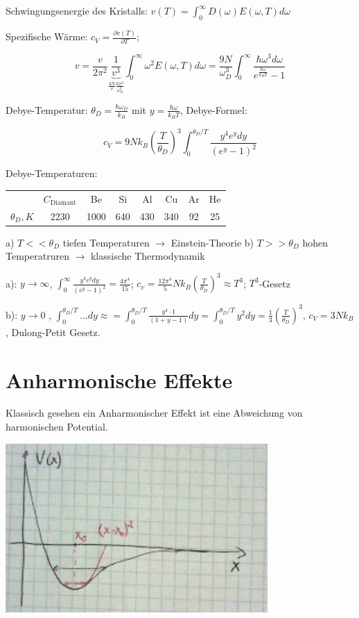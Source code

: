 Schwingungsenergie des Kristalls: \(v(T) = \int_0^\infty D(\omega) E(\omega,T) d\omega\)

Spezifische Wärme: \(c_V = \frac{\partial v(T)}{\partial T}\); 

\[v=\frac{v}{2\pi^2}\underbrace{\frac{1}{v^3}}_{\frac{3N}{v}\frac{6\pi^2}{\omega_D^3}}\int_0^\infty \omega^2 E(\omega,T) d\omega=\frac{9N}{\omega_D^3}\int_0^\infty\frac{\hbar \omega^3 d\omega}{e^{\frac{\hbar \omega}{k_B T}}-1}\]

Debye-Temperatur: \(\theta_D = \frac{\hbar \omega_D}{k_B}\) mit \(y= \frac{\hbar \omega}{k_BT}\), Debye-Formel:

\[ c_V = 9Nk_B\left(\frac{T}{\theta_D}\right)^3 \int_0^{\theta_D/T}\frac{y^4e^ydy}{(e^y-1)^2}\]


Debye-Temperaturen:

\begin{tabular}{c|ccccccc}
 &\(C_{\text{Diamant}}\)&Be&Si&Al&Cu&Ar&He\\
\(\theta_D,K\)&2230&1000&640&430&340&92&25
\end{tabular}

a) \(T<<\theta_D\) tiefen Temperaturen \(\rightarrow\) Einstein-Theorie
b) \(T>>\theta_D\) hohen Temperatruren  \(\rightarrow\) klassische Thermodynamik

a): \(y\rightarrow \infty\), \(\int_0^\infty \frac{y^4e^ydy}{(e^y-1)^2} = \frac{4\pi^4}{15}\); \(c_v = \frac{12\pi^4}{5}Nk_B\left(\frac{T}{\theta_D}\right)^3 \approx T^3\); \(T^3\)-Gesetz

b): \(y\rightarrow 0\) , \(\int_0^{\theta_D/T}...dy \approx = \int_0^{\theta_D/T}\frac{y^4\cdot 1}{(1+y-1)}dy= \int_0^{\theta_D/T}y^2dy=\frac{1}{3}\left(\frac{T}{\theta_D}\right)^3\), \(c_V=3Nk_B\), Dulong-Petit Gesetz.

\section{Anharmonische Effekte}

Klassisch gesehen ein Anharmonischer Effekt ist eine Abweichung von harmonischen Potential. 

\includegraphics[width=0.75\textwidth]{kap06_15.png}

